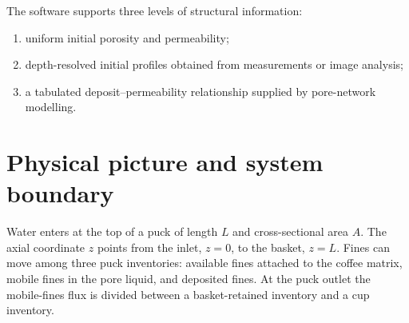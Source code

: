 \documentclass[11pt,a4paper]{article}
\begin{document}
The software supports three levels of structural information:
\begin{enumerate}
  \item uniform initial porosity and permeability;
  \item depth-resolved initial profiles obtained from measurements or image analysis;
  \item a tabulated deposit--permeability relationship supplied by pore-network modelling.
\end{enumerate}

\section{Physical picture and system boundary}

Water enters at the top of a puck of length $L$ and cross-sectional area $A$.
The axial coordinate $z$ points from the inlet, $z=0$, to the basket,
$z=L$. Fines can move among three puck inventories: available fines attached to
the coffee matrix, mobile fines in the pore liquid, and deposited fines. At the
puck outlet the mobile-fines flux is divided between a basket-retained inventory
and a cup inventory.
\end{document}
